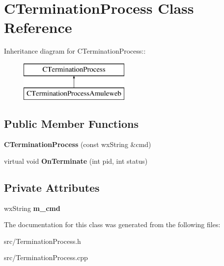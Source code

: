 \section{CTerminationProcess Class Reference}
\label{classCTerminationProcess}
Inheritance diagram for CTerminationProcess::\begin{figure}[H]
\begin{center}
\leavevmode
\includegraphics[height=2cm]{classCTerminationProcess}
\end{center}
\end{figure}
\subsection*{Public Member Functions}
\begin{DoxyCompactItemize}
\item 
{\bfseries CTerminationProcess} (const wxString \&cmd)\label{classCTerminationProcess_a47e0846aa9b8128a1240b7081b2a16d0}

\item 
virtual void {\bfseries OnTerminate} (int pid, int status)\label{classCTerminationProcess_a6f0088a3157a2540e0e68281584080c5}

\end{DoxyCompactItemize}
\subsection*{Private Attributes}
\begin{DoxyCompactItemize}
\item 
wxString {\bfseries m\_\-cmd}\label{classCTerminationProcess_aee32650bd57f285ee2fcfe4654c32214}

\end{DoxyCompactItemize}


The documentation for this class was generated from the following files:\begin{DoxyCompactItemize}
\item 
src/TerminationProcess.h\item 
src/TerminationProcess.cpp\end{DoxyCompactItemize}
